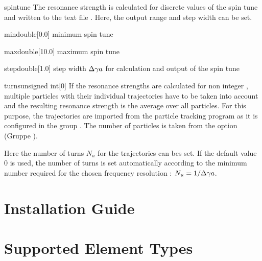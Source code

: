 \documentclass[a4paper]{scrartcl}
\begin{document}
\begin{configdocgroup}{spintune}
  The resonance strength is calculated for discrete values of the spin tune \ga and
  written to the text file . Here, the output range and
  step width can be set.

  \begin{configdoc}{min}{double}{}[0.0]
    minimum spin tune \ga
  \end{configdoc}

  \begin{configdoc}{max}{double}{}[10.0]
    maximum spin tune \ga
  \end{configdoc}

  \begin{configdoc}{step}{double}{}[1.0]
    step width $\Delta\gamma a$ for calculation and output of the spin tune
  \end{configdoc}
\end{configdocgroup}

\begin{configdoc}{turns}{unsigned int}{}[0]
  If the resonance strengths are calculated for non integer \ga, multiple particles with
  their individual trajectories have to be taken into account and the resulting resonance
  strength is the average over all particles. For this purpose, the trajectories are
  imported from the particle tracking program as it is configured in the group
  . The number of particles is taken from the option
   (Gruppe ).

  Here the number of turns $N_u$ for the trajectories can bes set. If the default value 0
  is used, the number of turns is set automatically according to the minimum number
  required for the chosen frequency resolution : $N_u = 1/\Delta\gamma a$.
\end{configdoc}



\clearpage
\appendix

\section{\ele Installation Guide}
\label{sec:ele-install}


\section{Supported Element Types}
\label{sec:types}
\end{document}
